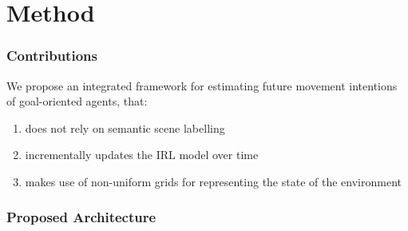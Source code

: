 \section{Method}

\begin{frame}
	\frametitle{Contributions}
	
	\Large
	
	\vspace{0.4cm}
	
	We propose an integrated framework for estimating future movement intentions of
	goal-oriented agents, that:
	
	\vspace{0.15cm}
	
	\begin{enumerate}
		\item does not rely on semantic scene labelling
		\item incrementally updates the IRL model over time
		\item makes use of non-uniform grids for representing the state of the environment
	\end{enumerate}
\end{frame}

\begin{frame}
	\frametitle{Proposed Architecture}
	
	\vspace{0.5cm}
	
\end{frame}

